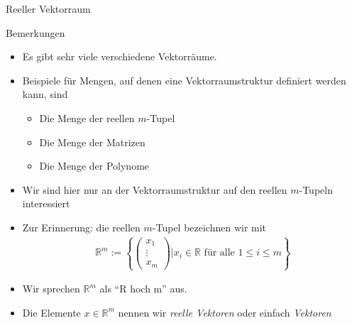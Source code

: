 \documentclass[
  8pt,
  ignorenonframetext,
]{beamer}
\providecommand{\tightlist}{%
  \setlength{\itemsep}{0pt}\setlength{\parskip}{0pt}}
\begin{document}
\begin{frame}{Reeller Vektorraum}
\protect\hypertarget{reeller-vektorraum-1}{}
\vspace{3mm}
\small
\justifying

Bemerkungen

\begin{itemize}
\tightlist
\item
  Es gibt sehr viele verschiedene Vektorräume.
\item
  Beispiele für Mengen, auf denen eine Vektorraumstruktur definiert
  werden kann, sind

  \begin{itemize}
  \tightlist
  \item
    \small Die Menge der reellen \(m\)-Tupel
  \item
    Die Menge der Matrizen
  \item
    Die Menge der Polynome
  \end{itemize}
\item
  Wir sind hier nur an der Vektorraumstruktur auf den reellen
  \(m\)-Tupeln interessiert
\item
  Zur Erinnerung: die reellen \(m\)-Tupel bezeichnen wir mit
  \begin{align*}
  \mathbb{R}^m := 
  \left\{
  \begin{pmatrix}
  x_1 \\ \vdots \\ x_m
  \end{pmatrix}
  \vert x_i \in \mathbb{R} \text{ für alle } 1 \leq i \leq m
  \right\}
  \end{align*}
\item
  Wir sprechen \(\mathbb{R}^m\) als ``R hoch m'' aus.
\item
  Die Elemente \(x \in \mathbb{R}^m\) nennen wir \emph{reelle Vektoren}
  oder einfach \emph{Vektoren}
\end{itemize}
\end{frame}
\end{document}
